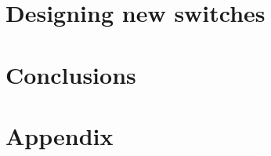 \documentclass[]{phdthesis}
\begin{document}
\mainmatter*
\chapter{Designing new switches}


\mainmatter*
\chapter{Conclusions}

\printbibliography

\appendix*
\chapter{Appendix}

\end{document}

